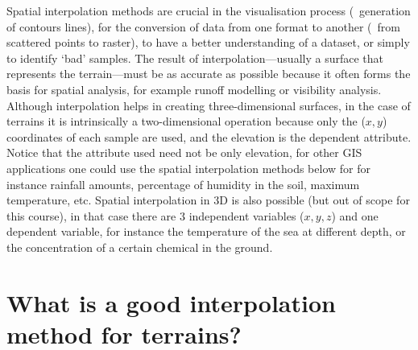 %

Spatial interpolation methods are crucial in the visualisation process (\eg\ generation of contours lines), for the conversion of data from one format to another (\eg\ from scattered points to raster), to have a better understanding of a dataset, or simply to identify `bad' samples. 
The result of interpolation---usually a surface that represents the terrain---must be as accurate as possible because it often forms the basis for spatial analysis, for example runoff modelling or visibility analysis. 
Although interpolation helps in creating three-dimensional surfaces, in the case of terrains it is intrinsically a two-dimensional operation because only the ($x,y$) coordinates of each sample are used, and the elevation is the dependent attribute.
Notice that the attribute used need not be only elevation, for other GIS applications one could use the spatial interpolation methods below for for instance rainfall amounts, percentage of humidity in the soil, maximum temperature, etc. 
Spatial interpolation in 3D is also possible (but out of scope for this course), in that case there are 3 independent variables ($x,y,z$) and one dependent variable, for instance the temperature of the sea at different depth, or the concentration of a certain chemical in the ground.


%


\section{What is a good interpolation method for terrains?}

